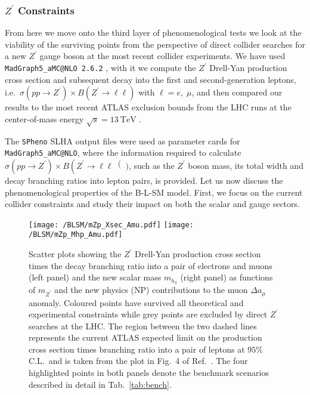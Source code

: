 \subsubsection{$Z^\prime$ Constraints}

From here we move onto the third layer of phenomenological tests we look at the viability of the surviving points from the perspective of direct collider searches for a new $Z^\prime$ gauge boson at the most recent collider experiments.
%
We have used \texttt{MadGraph5\_aMC@NLO 2.6.2} \cite{Alwall:2014hca}, with it we compute the $Z^\prime$ Drell-Yan production cross section and subsequent decay into the first and second-generation leptons, i.e.~$ \sigma \left( pp \to Z^\prime \right) \times B \left( Z^\prime \to \ell \ell\right)$ with $\ell = e,\; \mu$, and then compared our results to the most recent ATLAS exclusion bounds from the LHC runs at the center-of-mass energy $\sqrt{s} = 13~\textrm{TeV}$ \cite{Aaboud:2017buh}.

The \texttt{SPheno} SLHA output files were used as parameter cards for \texttt{MadGraph5\_aMC@NLO}, where the information required to calculate $ \sigma\left(pp \to Z^\prime\right) \times B\left(Z^\prime \to \ell \ell\right()$, such as the $Z^\prime$ boson mass, its total width and decay branching ratios into lepton pairs, is provided. 
%
%
%
%
Let us now discuss the phenomenological properties of the B-L-SM model. First, we focus on the current collider constraints and study their impact on both the scalar and gauge sectors.
\begin{figure}[H]
	\centering
	\texttt{[image: /BLSM/mZp\_Xsec\_Amu.pdf]}
	\texttt{[image: /BLSM/mZp\_Mhp\_Amu.pdf]}
	\caption{Scatter plots showing the $Z^\prime$ Drell-Yan production cross section times the decay branching ratio into a pair of electrons and muons (left panel) and the new scalar mass $m_{h_2}$ (right panel) as functions of $m_{Z^\prime}$ and the new physics (NP) contributions to the muon $\Delta a_\mu$ anomaly. Coloured points have survived all theoretical and experimental constraints while grey points are excluded by direct $Z^\prime$ searches at the LHC. The region between the two dashed lines represents the current ATLAS expected limit on the production cross section times branching ratio into a pair of leptons at $95\%$ C.L.~and is taken from the plot in Fig.~4 of Ref.~\cite{Aaboud:2017buh}. The four highlighted points in both panels denote the benchmark scenarios described in detail in Tab.~\ref{tab:bench}.}
	\label{fig:Plots1}
\end{figure}	

